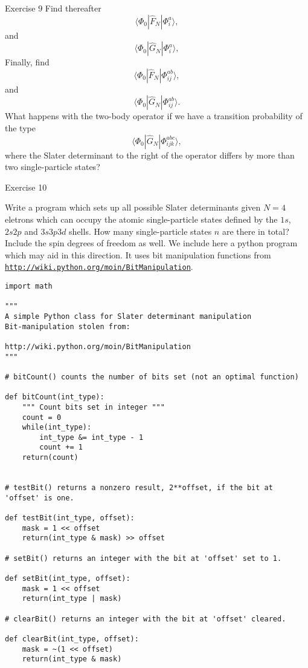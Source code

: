\documentclass{beamer}
\begin{document}
\begin{frame}
\begin{block}{Exercise 9 }
Find thereafter 
\[
\langle \Phi_0 |\hat{F}_N|\Phi_i^a\rangle,
\]
and
\[
\langle \Phi_0|\hat{G}_N|\Phi_i^a\rangle,
\]
Finally, find
\[
\langle \Phi_0 |\hat{F}_N|\Phi_{ij}^{ab}\rangle,
\]
and
\[
\langle \Phi_0|\hat{G}_N|\Phi_{ij}^{ab}\rangle.
\]
What happens with the two-body operator if we have a transition probability  of the type
\[
\langle \Phi_0|\hat{G}_N|\Phi_{ijk}^{abc}\rangle,
\]
where the Slater determinant to the right of the operator differs by more than two single-particle states?

\end{block}


\begin{block}{Exercise 10 }

Write a program which sets up all possible Slater determinants given $N=4$ eletrons which can occupy
the atomic single-particle states defined by the $1s$, $2s2p$ and $3s3p3d$ shells. How many single-particle
states $n$ are there in total?  Include the spin degrees of freedom as well.
We include here a python program which may aid in this direction. It uses bit manipulation functions from \href{{http://wiki.python.org/moin/BitManipulation}}{\nolinkurl{http://wiki.python.org/moin/BitManipulation}}.
\begin{verbatim}
import math

"""
A simple Python class for Slater determinant manipulation
Bit-manipulation stolen from:

http://wiki.python.org/moin/BitManipulation
"""

# bitCount() counts the number of bits set (not an optimal function)

def bitCount(int_type):
    """ Count bits set in integer """
    count = 0
    while(int_type):
        int_type &= int_type - 1
        count += 1
    return(count)


# testBit() returns a nonzero result, 2**offset, if the bit at 'offset' is one.

def testBit(int_type, offset):
    mask = 1 << offset
    return(int_type & mask) >> offset

# setBit() returns an integer with the bit at 'offset' set to 1.

def setBit(int_type, offset):
    mask = 1 << offset
    return(int_type | mask)

# clearBit() returns an integer with the bit at 'offset' cleared.

def clearBit(int_type, offset):
    mask = ~(1 << offset)
    return(int_type & mask)


\end{verbatim}
\end{block}
\end{frame}
\end{document}
